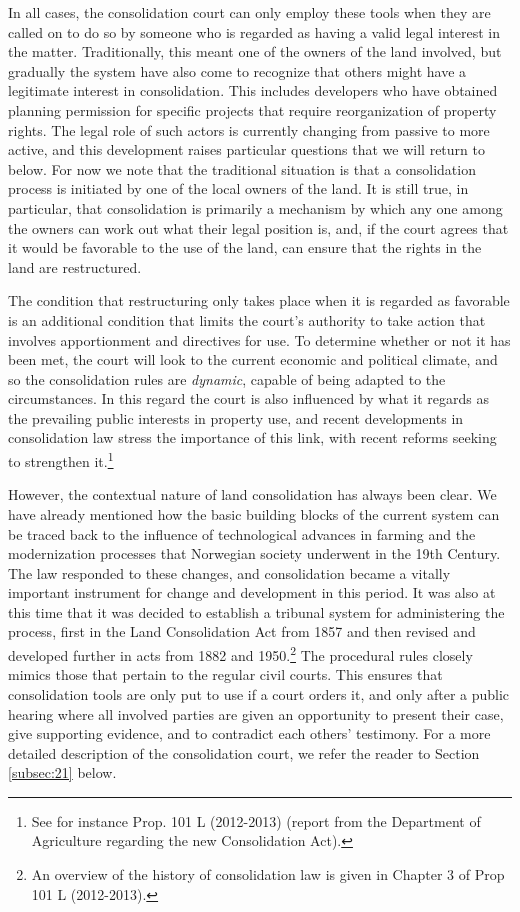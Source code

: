 In all cases, the consolidation court can only employ these tools when they are called on to do so by someone who is regarded as having a valid legal interest in the matter. Traditionally, this meant one of the owners of the land involved, but gradually the system have also come to recognize that others might have a legitimate interest in consolidation. This includes developers who have obtained planning permission for specific projects that require reorganization of property rights. The legal role of such actors is currently changing from passive to more active, and this development raises particular questions that we will return to below. For now we note that the traditional situation is that a consolidation process is initiated by one of the local owners of the land. It is still true, in particular, that consolidation is primarily a mechanism by which any one among the owners can work out what their legal position is, and, if the court agrees that it would be favorable to the use of the land, can ensure that the rights in the land are restructured.

The condition that restructuring only takes place when it is regarded as favorable is an additional condition that limits the court's authority to take action that involves apportionment and directives for use. To determine whether or not it has been met, the court will look to the current economic and political climate, and so the consolidation rules are \emph{dynamic}, capable of being adapted to the circumstances. In this regard the court is also influenced by what it regards as the prevailing public interests in property use, and recent developments in consolidation law stress the importance of this link, with recent reforms seeking to strengthen it.\footnote{See for instance Prop. 101 L (2012-2013) (report from the Department of Agriculture regarding the new Consolidation Act).}

However, the contextual nature of land consolidation has always been clear. We have already mentioned how the basic building blocks of the current system can be traced back to the influence of technological advances in farming and the modernization processes that Norwegian society underwent in the 19th Century. The law responded to these changes, and consolidation became a vitally important instrument for change and development in this period. It was also at this time that it was decided to establish a tribunal system for administering the process, first in the Land Consolidation Act from 1857 and then revised and developed further in acts from 1882 and 1950.\footnote{An overview of the history of consolidation law is given in Chapter 3 of Prop 101 L (2012-2013).} The procedural rules closely mimics those that pertain to the regular civil courts. This ensures that consolidation tools are only put to use if a court orders it, and only after a public hearing where all involved parties are given an opportunity to present their case, give supporting evidence, and to contradict each others' testimony. For a more detailed description of the consolidation court, we refer the reader to Section \ref{subsec:21} below.

